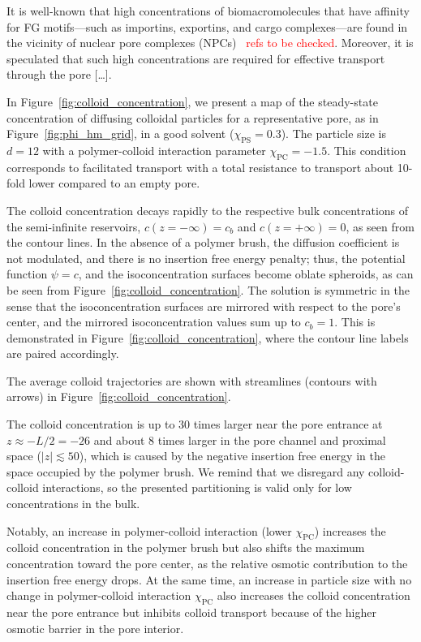 \documentclass[12pt, a4paper]{article}
\newcommand\todo[1]{\textcolor{red}{#1}}
\begin{document}
It is well-known that high concentrations of biomacromolecules that have affinity for FG motifs—such as importins, exportins, and cargo complexes—are found in the vicinity of nuclear pore complexes (NPCs)~\cite{Beck2007, Gruenwald2010, Tu2011} \todo{refs to be checked}.
Moreover, it is speculated that such high concentrations are required for effective transport through the pore [\dots].

In Figure~\ref{fig:colloid_concentration}, we present a map of the steady-state concentration of diffusing colloidal particles for a representative pore, as in Figure~\ref{fig:phi_hm_grid}, in a good solvent ($\chi_{\textrm{PS}} = 0.3$).
The particle size is $d = 12$ with a polymer-colloid interaction parameter $\chi_{\textrm{PC}} = -1.5$.
This condition corresponds to facilitated transport with a total resistance to transport about 10-fold lower compared to an empty pore.

The colloid concentration decays rapidly to the respective bulk concentrations of the semi-infinite reservoirs, $c(z = -\infty) = c_{b}$ and $c(z = +\infty) = 0$, as seen from the contour lines.
In the absence of a polymer brush, the diffusion coefficient is not modulated, and there is no insertion free energy penalty; thus, the potential function $\psi = c$, and the isoconcentration surfaces become oblate spheroids, as can be seen from Figure~\ref{fig:colloid_concentration}.
The solution is symmetric in the sense that the isoconcentration surfaces are mirrored with respect to the pore's center, and the mirrored isoconcentration values sum up to $c_{b} = 1$.
This is demonstrated in Figure~\ref{fig:colloid_concentration}, where the contour line labels are paired accordingly.

The average colloid trajectories are shown with streamlines (contours with arrows) in Figure~\ref{fig:colloid_concentration}.

The colloid concentration is up to 30 times larger near the pore entrance at $z \approx -L/2 = -26$ and about 8 times larger in the pore channel and proximal space ($|z| \lesssim 50$), which is caused by the negative insertion free energy in the space occupied by the polymer brush.
We remind that we disregard any colloid-colloid interactions, so the presented partitioning is valid only for low concentrations in the bulk.

Notably, an increase in polymer-colloid interaction (lower $\chi_{\textrm{PC}}$) increases the colloid concentration in the polymer brush but also shifts the maximum concentration toward the pore center, as the relative osmotic contribution to the insertion free energy drops.
At the same time, an increase in particle size with no change in polymer-colloid interaction $\chi_{\textrm{PC}}$ also increases the colloid concentration near the pore entrance but inhibits colloid transport because of the higher osmotic barrier in the pore interior.
\end{document}
